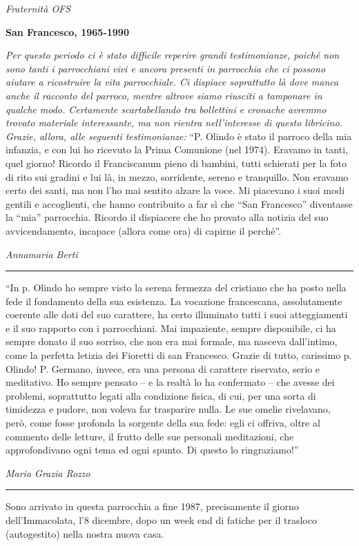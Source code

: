 \begin{flushright}
\textit{Fraternità OFS}
\end{flushright}
\bigskip
{}
{}
\begin{center}
\textbf{\Large San Francesco, 1965-1990}
\end{center}
\bigbreak
\noindent \textit{Per questo periodo ci è stato difficile reperire grandi testimonianze, poiché non sono tanti i
parrocchiani vivi e ancora presenti in parrocchia che ci possono aiutare a ricostruire la vita 
parrocchiale. Ci dispiace soprattutto là dove manca anche il racconto del parroco, mentre altrove siamo riusciti a tamponare in qualche modo. Certamente 
scartabellando tra bollettini e cronache avremmo trovato materiale interessante, ma non rientra 
nell’interesse di questo libricino. Grazie, allora, alle seguenti testimonianze:}
\medbreak
\noindent ``P. Olindo è stato il parroco della mia infanzia, e con lui ho ricevuto la Prima Comunione 
(nel 1974). Eravamo in tanti, quel giorno! Ricordo il Franciscanum pieno di bambini, tutti schierati 
per la foto di rito sui gradini e lui là, in mezzo, sorridente, sereno e tranquillo.
Non eravamo certo dei santi, ma non l’ho mai sentito alzare la voce.
Mi piacevano i suoi modi gentili e accoglienti, che hanno contribuito a far sì che “San Francesco” 
diventasse la “mia” parrocchia.
Ricordo il dispiacere che ho provato alla notizia del suo avvicendamento, incapace (allora come 
ora) di capirne il perché''.\par
\hfill\textit{Annamaria Berti}
\begin{center}
	\noindent\rule{0.5\textwidth}{0.4pt}
\end{center}
“In p. Olindo ho sempre visto la serena fermezza del cristiano che ha posto nella fede il 
fondamento della sua esistenza. La vocazione francescana, assolutamente coerente alle doti del suo 
carattere, ha certo illuminato tutti i suoi atteggiamenti e il suo rapporto con i parrocchiani. Mai 
impaziente, sempre disponibile, ci ha sempre donato il suo sorriso, che non era mai formale, ma 
nasceva dall’intimo, come la perfetta letizia dei Fioretti di san Francesco.
Grazie di tutto, carissimo p. Olindo! 
\medbreak
P. Germano, invece, era una persona di carattere riservato, serio e meditativo. Ho sempre 
pensato – e la realtà lo ha confermato – che avesse dei problemi, soprattutto legati alla condizione 
fisica, di cui, per una sorta di timidezza e pudore, non voleva far trasparire nulla.
Le sue omelie rivelavano, però, come fosse profonda la sorgente della sua fede: egli ci offriva, oltre al commento 
delle letture, il frutto delle sue personali meditazioni, che approfondivano ogni tema ed ogni spunto.
Di questo lo ringraziamo!”\par
\hfill\textit{Maria Grazia Rozzo}
\begin{center}
	\noindent\rule{0.5\textwidth}{0.4pt}
\end{center}
Sono arrivato in questa parrocchia a fine 1987, precisamente il giorno dell’Immacolata, l’8 
dicembre, dopo un week end di fatiche per il trasloco (autogestito) nella nostra nuova casa.

